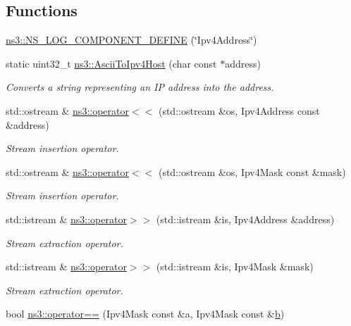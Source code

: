 \subsection*{Functions}
\begin{DoxyCompactItemize}
\item 
\hyperlink{namespacens3_a896ee6fad25b84e2fb69c87c9289377a}{ns3\+::\+N\+S\+\_\+\+L\+O\+G\+\_\+\+C\+O\+M\+P\+O\+N\+E\+N\+T\+\_\+\+D\+E\+F\+I\+NE} (\char`\"{}Ipv4\+Address\char`\"{})
\item 
static uint32\+\_\+t \hyperlink{namespacens3_ab91a873a4af974a483a5063587ffe5b9}{ns3\+::\+Ascii\+To\+Ipv4\+Host} (char const $\ast$address)
\begin{DoxyCompactList}\small\item\em Converts a string representing an IP address into the address. \end{DoxyCompactList}\item 
std\+::ostream \& \hyperlink{namespacens3_a2e42d09da8ec97eca2b163074577f91d}{ns3\+::operator$<$$<$} (std\+::ostream \&os, Ipv4\+Address const \&address)
\begin{DoxyCompactList}\small\item\em Stream insertion operator. \end{DoxyCompactList}\item 
std\+::ostream \& \hyperlink{namespacens3_aec2b5a9d9fc57f99295da6846f0d7d84}{ns3\+::operator$<$$<$} (std\+::ostream \&os, Ipv4\+Mask const \&mask)
\begin{DoxyCompactList}\small\item\em Stream insertion operator. \end{DoxyCompactList}\item 
std\+::istream \& \hyperlink{namespacens3_a8f45477579279b657011b3f9b2afa3ba}{ns3\+::operator$>$$>$} (std\+::istream \&is, Ipv4\+Address \&address)
\begin{DoxyCompactList}\small\item\em Stream extraction operator. \end{DoxyCompactList}\item 
std\+::istream \& \hyperlink{namespacens3_a67a1db42c6476a71c39e4f6b43d98729}{ns3\+::operator$>$$>$} (std\+::istream \&is, Ipv4\+Mask \&mask)
\begin{DoxyCompactList}\small\item\em Stream extraction operator. \end{DoxyCompactList}\item 
bool \hyperlink{namespacens3_aa47870b17293b613f3e25b0b86af8100}{ns3\+::operator==} (Ipv4\+Mask const \&a, Ipv4\+Mask const \&\hyperlink{lte__pathloss_8m_a21ad0bd836b90d08f4cf640b4c298e7c}{b})

\end{DoxyCompactItemize}
